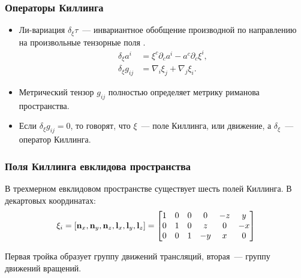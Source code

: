 \documentclass[compress]{beamer}
\begin{document}
    \begin{frame}\frametitle{Операторы Киллинга}

        \begin{itemize}

            \item Ли-вариация $\delta_\xi\tau$~--- инвариантное обобщение производной по направлению на произвольные тензорные поля \cite{lie_derivative_theory,symmetry_and_killing_fields}.
            \begin{equation*}\begin{aligned}
                \delta_\xi a^i &= \xi^c \partial_c a^i - a^c \partial_{c} \xi^i , \\
                \delta_\xi g_{ij} &= \nabla_i \xi_j + \nabla_j \xi_i .
            \end{aligned}\end{equation*}

            \item Метрический тензор $g_{ij}$ полностью определяет метрику риманова пространства.

            \item Если $\delta_\xi g_{ij} = 0$, то говорят, что $\xi$~--- поле Киллинга, или движение, а $\delta_\xi$~--- оператор Киллинга.

        \end{itemize}

    \end{frame}


    \begin{frame}\frametitle{Поля Киллинга евклидова пространства}

        В трехмерном евклидовом пространстве существует шесть полей Киллинга. В декартовых координатах:
        \begin{equation*}
            \mathbf{\xi}_i
            =
            \left[
                \mathbf{n}_x, \mathbf{n}_y, \mathbf{n}_z,
                \mathbf{l}_x, \mathbf{l}_y, \mathbf{l}_z
            \right]
            =
            \begin{bmatrix}
                1 & 0 & 0 & 0  & -z & y  \\
                0 & 1 & 0 & z  & 0  & -x \\
                0 & 0 & 1 & -y & x  & 0
            \end{bmatrix}
        \end{equation*}

        Первая тройка образует группу движений трансляций, вторая~--- группу движений вращений.

    \end{frame}
\end{document}
